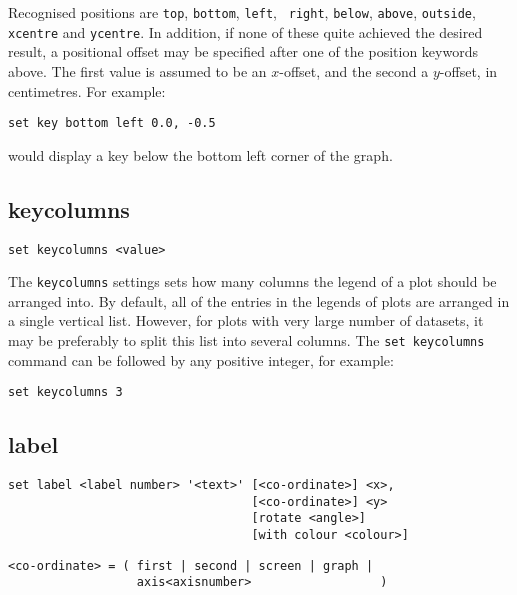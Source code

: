 Recognised positions are {\tt top}, {\tt bottom}, {\tt left}, {\tt
right}, {\tt below}, {\tt above}, {\tt outside}, {\tt xcentre} and
{\tt ycentre}. In addition, if none of these quite achieved the desired
result, a positional offset may be specified after one of the position keywords
above.  The first value is assumed to be an $x$-offset, and the second a
$y$-offset, in centimetres.  For example:

\begin{verbatim}
set key bottom left 0.0, -0.5
\end{verbatim}

\noindent would display a key below the bottom left corner of the graph.


\subsection{keycolumns}

\begin{verbatim}
set keycolumns <value>
\end{verbatim}

The {\tt keycolumns} settings sets how many columns the legend of a plot should
be arranged into. By default, all of the entries in the legends of plots are
arranged in a single vertical list. However, for plots with very large number
of datasets, it may be preferably to split this list into several columns. The
{\tt set keycolumns} command can be followed by any positive integer, for
example:

\begin{verbatim}
set keycolumns 3
\end{verbatim}


\subsection{label}

\begin{verbatim}
set label <label number> '<text>' [<co-ordinate>] <x>,
                                  [<co-ordinate>] <y>
                                  [rotate <angle>]
                                  [with colour <colour>]
\end{verbatim}

\begin{verbatim}
<co-ordinate> = ( first | second | screen | graph |
                  axis<axisnumber>                  )
\end{verbatim}

